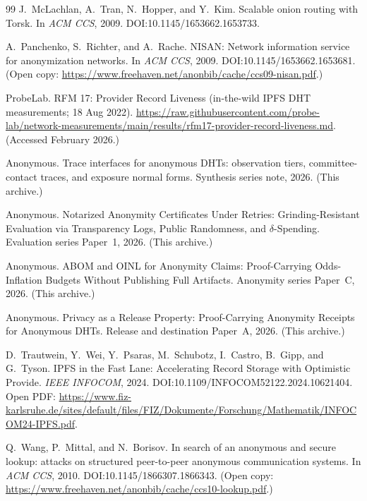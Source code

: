 \documentclass[11pt]{article}
\begin{document}
\begin{thebibliography}{99}
J.~McLachlan, A.~Tran, N.~Hopper, and Y.~Kim.
\newblock Scalable onion routing with Torsk.
\newblock In \emph{ACM CCS}, 2009.
\newblock DOI:10.1145/1653662.1653733.

A.~Panchenko, S.~Richter, and A.~Rache.
\newblock NISAN: Network information service for anonymization networks.
\newblock In \emph{ACM CCS}, 2009.
\newblock DOI:10.1145/1653662.1653681. (Open copy: \url{https://www.freehaven.net/anonbib/cache/ccs09-nisan.pdf}.)

ProbeLab.
\newblock RFM 17: Provider Record Liveness (in-the-wild IPFS DHT measurements; 18 Aug 2022).
\newblock \url{https://raw.githubusercontent.com/probe-lab/network-measurements/main/results/rfm17-provider-record-liveness.md}. (Accessed February 2026.)

Anonymous.
\newblock Trace interfaces for anonymous DHTs: observation tiers, committee-contact traces, and exposure normal forms.
\newblock Synthesis series note, 2026. (This archive.)

Anonymous.
\newblock Notarized Anonymity Certificates Under Retries: Grinding-Resistant Evaluation via Transparency Logs, Public Randomness, and $\delta$-Spending.
\newblock Evaluation series Paper~1, 2026. (This archive.)

Anonymous.
\newblock ABOM and OINL for Anonymity Claims: Proof-Carrying Odds-Inflation Budgets Without Publishing Full Artifacts.
\newblock Anonymity series Paper~C, 2026. (This archive.)

Anonymous.
\newblock Privacy as a Release Property: Proof-Carrying Anonymity Receipts for Anonymous DHTs.
\newblock Release and destination Paper~A, 2026. (This archive.)

D.~Trautwein, Y.~Wei, Y.~Psaras, M.~Schubotz, I.~Castro, B.~Gipp, and G.~Tyson.
\newblock IPFS in the Fast Lane: Accelerating Record Storage with Optimistic Provide.
\newblock \emph{IEEE INFOCOM}, 2024.
\newblock DOI:10.1109/INFOCOM52122.2024.10621404.
\newblock Open PDF: \url{https://www.fiz-karlsruhe.de/sites/default/files/FIZ/Dokumente/Forschung/Mathematik/INFOCOM24-IPFS.pdf}.

Q.~Wang, P.~Mittal, and N.~Borisov.
\newblock In search of an anonymous and secure lookup: attacks on structured peer-to-peer anonymous communication systems.
\newblock In \emph{ACM CCS}, 2010.
\newblock DOI:10.1145/1866307.1866343. (Open copy: \url{https://www.freehaven.net/anonbib/cache/ccs10-lookup.pdf}.)


\end{thebibliography}
\end{document}
